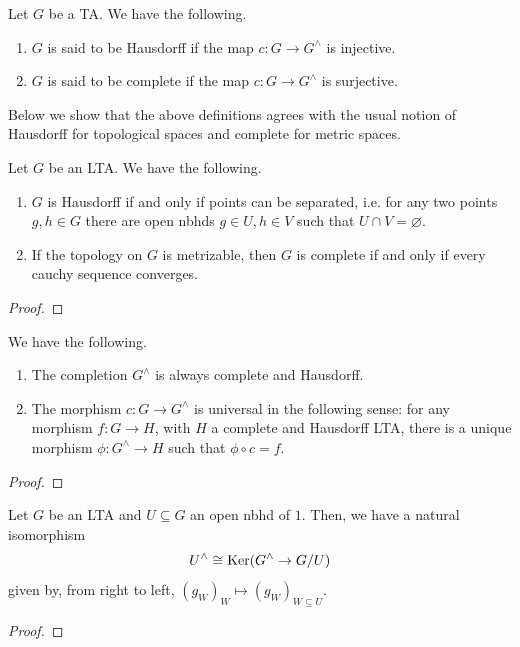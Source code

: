 \begin{definition}\label{def:c_map_and_cauchy_sequences} Let $G$ be a TA. We have the following.
\begin{enumerate}
    \item[(i)] $G$ is said to be Hausdorff if the map $c : G \rightarrow G^\land$ is injective.
    \item[(ii)] $G$ is said to be complete if the map $c : G \rightarrow G^\land$ is surjective.
\end{enumerate}
\end{definition}

\noindent Below we show that the above definitions agrees with the usual notion of Hausdorff for topological spaces and complete for metric spaces.

\begin{proposition} Let $G$ be an LTA. We have the following.
\begin{enumerate}
    \item[(i)] $G$ is Hausdorff if and only if points can be separated, i.e. for any two points $g, h \in G$ there are open nbhds $g \in U, h \in V$ such that $U \cap V = \varnothing$.
    \item[(ii)] If the topology on $G$ is metrizable, then $G$ is complete if and only if every cauchy sequence converges.
\end{enumerate}
\end{proposition}
\begin{proof} \TODO
\end{proof}

\begin{proposition} We have the following.
\begin{enumerate}
    \item[(i)] The completion $G^\land$ is always complete and Hausdorff.
    \item[(ii)] The morphism $c : G \rightarrow G^\land$ is universal in the following sense: for any morphism $f : G \rightarrow H$, with $H$ a complete and Hausdorff LTA, there is a unique morphism $\phi : G^\land \rightarrow H$ such that $\phi \circ c = f$.
\end{enumerate}
\end{proposition}
\begin{proof} \TODO
\end{proof}

\begin{proposition} Let $G$ be an LTA and $U \subseteq G$ an open nbhd of $1$. Then, we have a natural isomorphism $$U^\land \cong {\rm Ker}(G^\land \rightarrow G/U)$$
given by, from right to left, $(g_W)_W \mapsto (g_{W})_{W \subseteq U}$.
\end{proposition}
\begin{proof} \TODO
\end{proof}

